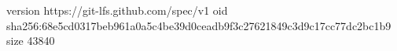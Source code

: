 version https://git-lfs.github.com/spec/v1
oid sha256:68e5cd0317beb961a0a5c4be39d0ceadb9f3c27621849c3d9c17cc77dc2bc1b9
size 43840
